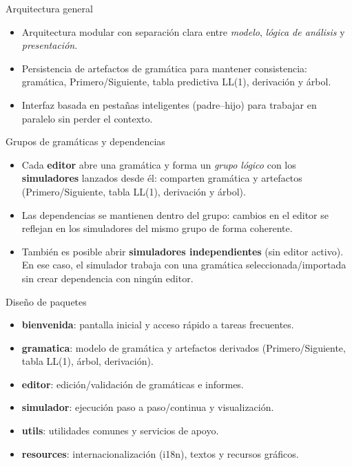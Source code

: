 \begin{frame}{Arquitectura general}
  \begin{itemize}
    \item Arquitectura modular con separación clara entre \emph{modelo}, \emph{lógica de análisis} y \emph{presentación}.
    \item Persistencia de artefactos de gramática para mantener consistencia: gramática, Primero/Siguiente, tabla predictiva LL(1), derivación y árbol.
    \item Interfaz basada en pestañas inteligentes (padre–hijo) para trabajar en paralelo sin perder el contexto.
  \end{itemize}
\end{frame}

\begin{frame}{Grupos de gramáticas y dependencias}
  \begin{itemize}
    \item Cada \textbf{editor} abre una gramática y forma un \emph{grupo lógico} con los \textbf{simuladores} lanzados desde él: comparten gramática y artefactos (Primero/Siguiente, tabla LL(1), derivación y árbol).
    \item Las dependencias se mantienen dentro del grupo: cambios en el editor se reflejan en los simuladores del mismo grupo de forma coherente.
    \item También es posible abrir \textbf{simuladores independientes} (sin editor activo). En ese caso, el simulador trabaja con una gramática seleccionada/importada sin crear dependencia con ningún editor.
  \end{itemize}
\end{frame}

\begin{frame}{Diseño de paquetes}
  \begin{itemize}
    \item \textbf{bienvenida}: pantalla inicial y acceso rápido a tareas frecuentes.
    \item \textbf{gramatica}: modelo de gramática y artefactos derivados (Primero/Siguiente, tabla LL(1), árbol, derivación).
    \item \textbf{editor}: edición/validación de gramáticas e informes.
    \item \textbf{simulador}: ejecución paso a paso/continua y visualización.
    \item \textbf{utils}: utilidades comunes y servicios de apoyo.
    \item \textbf{resources}: internacionalización (i18n), textos y recursos gráficos.
  \end{itemize}
\end{frame}

